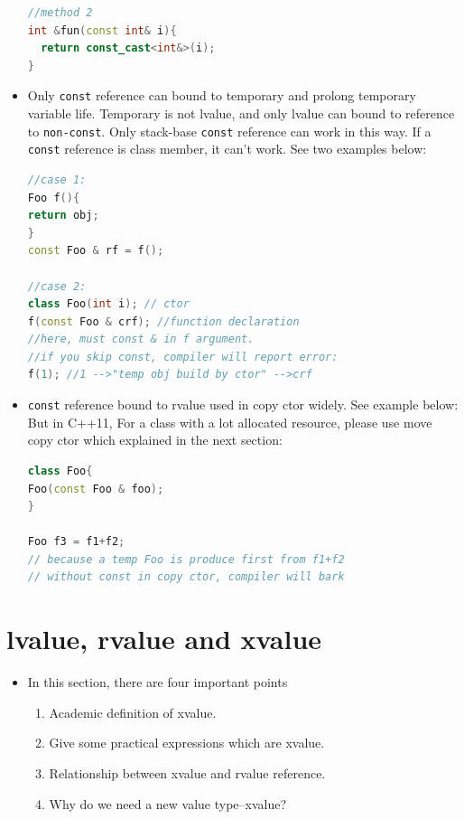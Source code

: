 \documentclass[a4paper,12pt,twoside]{book}
\begin{document}
\begin{itemize}
\begin{lstlisting}[frame=single, language=c++]
//method 2
int &fun(const int& i){
  return const_cast<int&>(i);
}
\end{lstlisting}

\item Only \texttt{const} reference can bound to temporary and prolong temporary variable life. Temporary is not lvalue, and only lvalue can bound to reference to \texttt{non-const}. Only stack-base \texttt{const} reference can work in this way. If a \texttt{const} reference is class member, it can't work.  See two examples below:
\begin{lstlisting}[frame=single, language=c++]
//case 1:
Foo f(){
return obj;
}
const Foo & rf = f();

//case 2:
class Foo(int i); // ctor
f(const Foo & crf); //function declaration
//here, must const & in f argument.
//if you skip const, compiler will report error:
f(1); //1 -->"temp obj build by ctor" -->crf
\end{lstlisting}

\item \texttt{const} reference bound to rvalue used in copy ctor widely. See example below: But in C++11, For a class with a lot allocated resource, please use move copy ctor which explained in the next section:

\begin{lstlisting}[frame=single, language=c++]
class Foo{
Foo(const Foo & foo);
}

Foo f3 = f1+f2;
// because a temp Foo is produce first from f1+f2
// without const in copy ctor, compiler will bark
\end{lstlisting}
\end{itemize}

\section{lvalue, rvalue and xvalue}
\begin{itemize}
	\item In this section, there are four important points
	\begin{enumerate}
		\item Academic definition of xvalue.
		\item Give some practical expressions which are xvalue.
		\item Relationship between xvalue and rvalue reference.
		\item Why do we need a new value type--xvalue?
	\end{enumerate}
	
\end{itemize}
\end{document}
